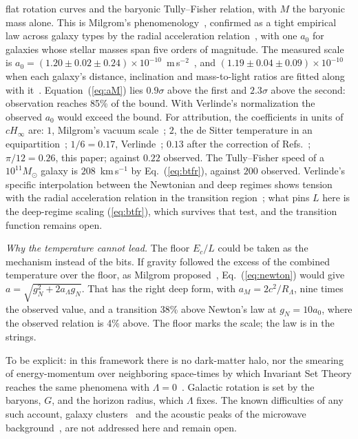 \documentclass[aps,prd,twocolumn,superscriptaddress,nofootinbib,showkeys]{revtex4-2}
\newcommand{\Ec}{E_c}
\newcommand{\RL}{R_\Lambda}
\begin{document}
flat rotation curves and the baryonic Tully--Fisher relation, with $M$ the baryonic mass alone. This is Milgrom's phenomenology~\cite{milgrom1983}, confirmed as a tight empirical law across galaxy types by the radial acceleration relation~\cite{mcgaugh2016}, with one $a_0$ for galaxies whose stellar masses span five orders of magnitude. The measured scale is $a_0 = (1.20\pm0.02\pm0.24)\times10^{-10}$~m\,s$^{-2}$~\cite{mcgaugh2016}, and $(1.19\pm0.04\pm0.09)\times10^{-10}$ when each galaxy's distance, inclination and mass-to-light ratios are fitted along with it~\cite{desmond2023}. Equation~(\ref{eq:aM}) lies $0.9\sigma$ above the first and $2.3\sigma$ above the second: observation reaches 85\% of the bound. With Verlinde's normalization the observed $a_0$ would exceed the bound. For attribution, the coefficients in units of $cH_\infty$ are: $1$, Milgrom's vacuum scale~\cite{milgrom1999}; $2$, the de Sitter temperature in an equipartition~\cite{hominicng2010}; $1/6 = 0.17$, Verlinde~\cite{verlinde2017}; $0.13$ after the correction of Refs.~\cite{yoon2025,yoon2023}; $\pi/12 = 0.26$, this paper; against $0.22$ observed. The Tully--Fisher speed of a $10^{11}M_\odot$ galaxy is $208$~km\,s$^{-1}$ by Eq.~(\ref{eq:btfr}), against $200$ observed. Verlinde's specific interpolation between the Newtonian and deep regimes shows tension with the radial acceleration relation in the transition region~\cite{lelli2017}; what pins $L$ here is the deep-regime scaling (\ref{eq:btfr}), which survives that test, and the transition function remains open.

\textit{Why the temperature cannot lead.} The floor $\Ec/L$ could be taken as the mechanism instead of the bits. If gravity followed the excess of the combined temperature over the floor, as Milgrom proposed~\cite{milgrom1999}, Eq.~(\ref{eq:newton}) would give $a = \sqrt{g_N^2 + 2a_\Lambda g_N}$. That has the right deep form, with $a_M = 2c^2/\RL$, nine times the observed value, and a transition 38\% above Newton's law at $g_N = 10a_0$, where the observed relation is 4\% above. The floor marks the scale; the law is in the strings.

To be explicit: in this framework there is no dark-matter halo, nor the smearing of energy-momentum over neighboring space-times by which Invariant Set Theory reaches the same phenomena with $\Lambda = 0$~\cite{palmer2016,hance2025}. Galactic rotation is set by the baryons, $G$, and the horizon radius, which $\Lambda$ fixes. The known difficulties of any such account, galaxy clusters~\cite{clowe2006} and the acoustic peaks of the microwave background~\cite{planck2018}, are not addressed here and remain open.
\end{document}
